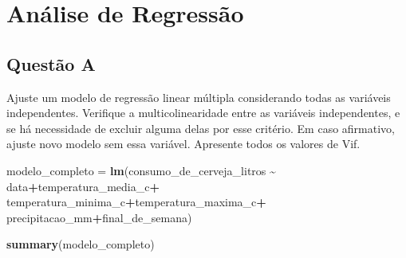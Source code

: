 \documentclass[
]{article}
\newenvironment{Shaded}{\begin{snugshade}}{\end{snugshade}}
\newcommand{\FunctionTok}[1]{\textcolor[rgb]{0.13,0.29,0.53}{\textbf{#1}}}
\newcommand{\NormalTok}[1]{#1}
\newcommand{\OtherTok}[1]{\textcolor[rgb]{0.56,0.35,0.01}{#1}}
\newcommand{\SpecialCharTok}[1]{\textcolor[rgb]{0.81,0.36,0.00}{\textbf{#1}}}
\begin{document}
\begin{Shaded}
\end{Shaded}

\hypertarget{anuxe1lise-de-regressuxe3o}{%
\section{Análise de Regressão}\label{anuxe1lise-de-regressuxe3o}}

\hypertarget{questuxe3o-a}{%
\subsection{Questão A}\label{questuxe3o-a}}

Ajuste um modelo de regressão linear múltipla considerando todas as
variáveis independentes. Verifique a multicolinearidade entre as
variáveis independentes, e se há necessidade de excluir alguma delas por
esse critério. Em caso afirmativo, ajuste novo modelo sem essa variável.
Apresente todos os valores de Vif.

\begin{Shaded}
\begin{Highlighting}[]
\NormalTok{modelo\_completo }\OtherTok{=} \FunctionTok{lm}\NormalTok{(consumo\_de\_cerveja\_litros }\SpecialCharTok{\textasciitilde{}}\NormalTok{ data}\SpecialCharTok{+}\NormalTok{temperatura\_media\_c}\SpecialCharTok{+}
\NormalTok{                       temperatura\_minima\_c}\SpecialCharTok{+}\NormalTok{temperatura\_maxima\_c}\SpecialCharTok{+}
\NormalTok{                       precipitacao\_mm}\SpecialCharTok{+}\NormalTok{final\_de\_semana)}

\FunctionTok{summary}\NormalTok{(modelo\_completo)}
\end{Highlighting}
\end{Shaded}
\end{document}
